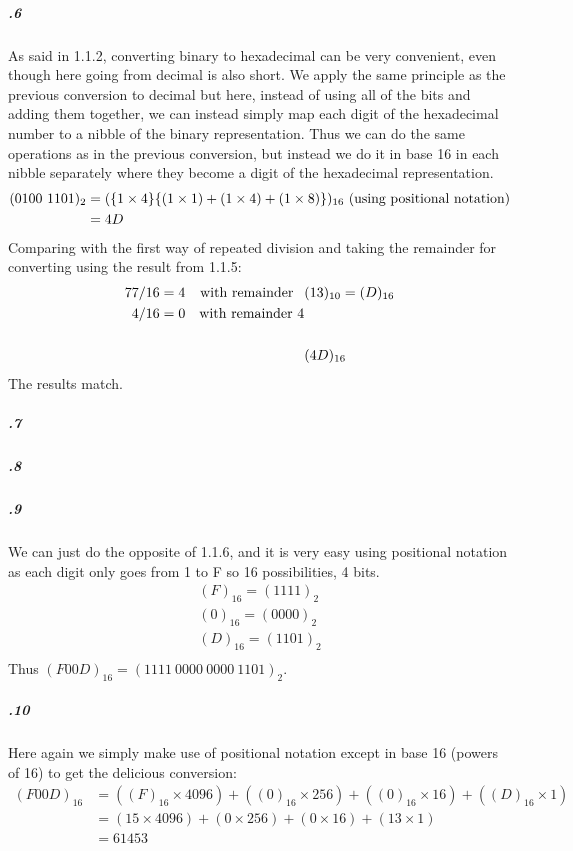 \documentclass[11pt,letterpaper]{article}
\begin{document}
		\subparagraph{.6}
		As said in 1.1.2, converting binary to hexadecimal can be very convenient, even though here going from decimal is also short. We apply the same principle as the previous conversion to decimal but here, instead of using all of the bits and adding them together, we can instead simply map each digit of the hexadecimal number to a nibble of the binary representation. Thus we can do the same operations as in the previous conversion, but instead we do it in base 16 in each nibble separately where they become a digit of the hexadecimal representation.
		\begin{align*}
		(0100\ 1101)_2 &= (\{1 \times 4\}\{(1 \times 1) + (1 \times 4) + (1 \times 8)\})_{16}\textnormal{ (using positional notation)}\\
		&= 4D
		\end{align*}
		Comparing with the first way of repeated division and taking the remainder for converting using the result from 1.1.5:
		\begin{align*}
		77 / 16 &= 4&\textnormal{with remainder\;\;\:}&(13)_{10} = (D)_{16}\\
		 4 / 16 &= 0&\textnormal{with remainder 4}&\\
		\\
		&&&(4D)_{16}
		\end{align*}
		The results match.
		
		\subparagraph{.7}
		
		\subparagraph{.8}
		
		\subparagraph{.9}
		We can just do the opposite of 1.1.6, and it is very easy using positional notation as each digit only goes from 1 to F so 16 possibilities, 4 bits.
		\begin{align*}
		(F)_{16} = (1111)_2\\
		(0)_{16} = (0000)_2\\
		(D)_{16} = (1101)_2\\
		\end{align*}
		Thus $(F00D)_{16} = (1111\ 0000\ 0000\ 1101)_2$.
		
		\subparagraph{.10}
		Here again we simply make use of positional notation except in base 16 (powers of 16) to get the delicious conversion:
		\begin{align*}
		(F00D)_16 &= ((F)_{16} \times 4096) + ((0)_{16} \times 256) + ((0)_{16} \times 16) + ((D)_{16} \times 1)\\
		&= (15 \times 4096) + (0 \times 256) + (0 \times 16) + (13 \times 1)\\
		&= 61 453
		\end{align*}
		
\end{document}
